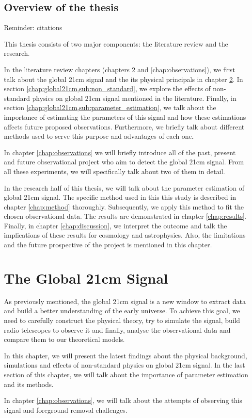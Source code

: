 \documentclass[12pt, TexShade, letterpaper]{report}
\begin{document}
\section{Overview of the thesis}
Reminder: citations\par
This thesis consists of two major components: the literature review and the research.\par
In the literature review chapters (chapters \ref{chap:global21cm} and \ref{chap:observations}), we first talk about the global 21cm signal and the its physical principals in chapter \ref{chap:global21cm}. In section \ref{chap:global21cm,sub:non_standard}, we explore the effects of non-standard physics on global 21cm signal mentioned in the literature. Finally, in section \ref{chap:global21cm,sub:parameter_estimation}, we talk about the importance of estimating the parameters of this signal and how these estimations affects future proposed observations. Furthermore, we briefly talk about different methods used to serve this purpose and advantages of each one.\par
In chapter \ref{chap:observations} we will briefly introduce all of the past, present and future observational project who aim to detect the global 21cm signal. From all these experiments, we will specifically talk about two of them in detail.\par
In the research half of this thesis, we will talk about the parameter estimation of global 21cm signal. The specific method used in this this study is described in chapter \ref{chap:method} thoroughly. Subsequently, we apply this method to fit the chosen observational data. The results are demonstrated in chapter \ref{chap:results}. Finally, in chapter \ref{chap:discussion}, we interpret the outcome and talk the implications of these results for cosmology and astrophysics. Also, the limitations and the future prospective of the project is mentioned in this chapter.\par
\chapter{The Global 21cm Signal}
\label{chap:global21cm}
As previously mentioned, the global 21cm signal is a new window to extract data and build a better understanding of the early universe. To achieve this goal, we need to carefully construct the physical theory, try to simulate the signal, build radio telescopes to observe it and finally, analyse the observational data and compare them to our theoretical models.\par
In this chapter, we will present the latest findings about the physical background, simulations and effects of non-standard physics on global 21cm signal. In the last section of this chapter, we will talk about the importance of parameter estimation and its methods.\par
In chapter \ref{chap:observations}, we will talk about the attempts of observing this signal and foreground removal challenges.\par
\end{document}
